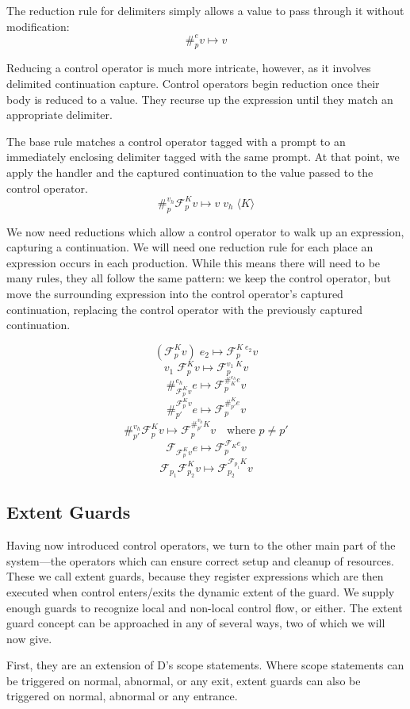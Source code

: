 \documentclass[11pt]{article}
\newcommand{\maybePage}{\newpage}
\newcommand\F{\mathcal{F}}
\newcommand{\angles}[1]{\langle#1\rangle}
\begin{document}
The reduction rule for delimiters simply allows a value to pass through it without modification:
$$\#_p^e v \mapsto v$$

Reducing a control operator is much more intricate, however, as it involves delimited continuation capture.
Control operators begin reduction once their body is reduced to a value.
They recurse up the expression until they match an appropriate delimiter.

The base rule matches a control operator tagged with a prompt to an immediately enclosing delimiter tagged with the same prompt.
At that point, we apply the handler and the captured continuation to the value passed to the control operator.
$$\#_p^{v_h}\F_p^Kv \mapsto v\;v_h\;\angles K$$

We now need reductions which allow a control operator to walk up an expression, capturing a continuation.
We will need one reduction rule for each place an expression occurs in each production.
While this means there will need to be many rules, they all follow the same pattern:
we keep the control operator, but move the surrounding expression into the control operator's captured continuation, replacing the control operator with the previously captured continuation.

$$(\F^K_pv)\;e_2 \mapsto \F^{K\;e_2}_pv$$
$$v_1\;\F^K_pv \mapsto \F^{v_1\;K}_pv$$
$$\#_{\F_p^Kv}^{e_h}e \mapsto \F_p^{\#_K^{e_h}e}v$$
$$\#^{\F_p^Kv}_{p'}e \mapsto \F_p^{\#^K_{p'}e}v$$
$$\#_{p'}^{v_h}\F^K_pv \mapsto \F^{\#_{p'}^{v_h}K}_pv
  	\quad\textrm{where }p \neq p'$$
$$\F_{\F^K_pv}e \mapsto \F^{\F_Ke}_pv$$
$$\F_{p_1}\F^K_{p_2}v \mapsto \F^{\F_{p_1}K}_{p_2}v$$

\maybePage
\subsection{Extent Guards}
\label{subsec:extentGuards}

Having now introduced control operators, we turn to the other main part of the system---the operators which can ensure correct setup and cleanup of resources.
These we call extent guards, because they register expressions which are then executed when control enters/exits the dynamic extent of the guard.
We supply enough guards to recognize local and non-local control flow, or either.
The extent guard concept can be approached in any of several ways, two of which we will now give.

First, they are an extension of D's scope statements.
Where scope statements can be triggered on normal, abnormal, or any exit, extent guards can also be triggered on normal, abnormal or any entrance.
\end{document}

